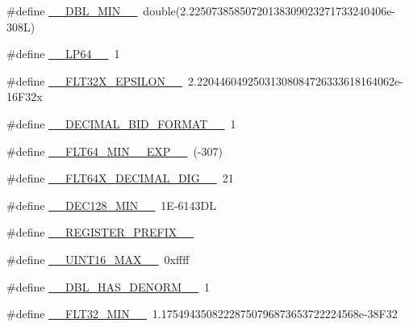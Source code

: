 \begin{DoxyCompactItemize}
\#define \hyperlink{cmake-build-debug_2babel__client__autogen_2moc__predefs_8h_a3b29a64a7b1529c08f87d256d20aade1}{\+\_\+\+\_\+\+D\+B\+L\+\_\+\+M\+I\+N\+\_\+\+\_\+}~double(2.\+22507385850720138309023271733240406e-\/308\+L)
\item 
\#define \hyperlink{cmake-build-debug_2babel__client__autogen_2moc__predefs_8h_a1939a48605c72ad163215e2279590fd5}{\+\_\+\+\_\+\+L\+P64\+\_\+\+\_\+}~1
\item 
\#define \hyperlink{cmake-build-debug_2babel__client__autogen_2moc__predefs_8h_a0d5ee390eabd4483e834007b5824373b}{\+\_\+\+\_\+\+F\+L\+T32\+X\+\_\+\+E\+P\+S\+I\+L\+O\+N\+\_\+\+\_\+}~2.\+22044604925031308084726333618164062e-\/16\+F32x
\item 
\#define \hyperlink{cmake-build-debug_2babel__client__autogen_2moc__predefs_8h_a31d221e4eef1a1f2104fe93a4236cae0}{\+\_\+\+\_\+\+D\+E\+C\+I\+M\+A\+L\+\_\+\+B\+I\+D\+\_\+\+F\+O\+R\+M\+A\+T\+\_\+\+\_\+}~1
\item 
\#define \hyperlink{cmake-build-debug_2babel__client__autogen_2moc__predefs_8h_a7a06acb3945879bcc985dde7bf0bcbdc}{\+\_\+\+\_\+\+F\+L\+T64\+\_\+\+M\+I\+N\+\_\+\_\+\+E\+X\+P\+\_\+\+\_\+}~(-\/307)
\item 
\#define \hyperlink{cmake-build-debug_2babel__client__autogen_2moc__predefs_8h_af8596ef3c857ab5d96960185ebc92014}{\+\_\+\+\_\+\+F\+L\+T64\+X\+\_\+\+D\+E\+C\+I\+M\+A\+L\+\_\+\+D\+I\+G\+\_\+\+\_\+}~21
\item 
\#define \hyperlink{cmake-build-debug_2babel__client__autogen_2moc__predefs_8h_afa4fe1921202e3770143345532136860}{\+\_\+\+\_\+\+D\+E\+C128\+\_\+\+M\+I\+N\+\_\+\+\_\+}~1\+E-\/6143\+DL
\item 
\#define \hyperlink{cmake-build-debug_2babel__client__autogen_2moc__predefs_8h_a08d4062230ffc8494f4be4f6447497e4}{\+\_\+\+\_\+\+R\+E\+G\+I\+S\+T\+E\+R\+\_\+\+P\+R\+E\+F\+I\+X\+\_\+\+\_\+}
\item 
\#define \hyperlink{cmake-build-debug_2babel__client__autogen_2moc__predefs_8h_a17f94731962876cdac979ae093f52605}{\+\_\+\+\_\+\+U\+I\+N\+T16\+\_\+\+M\+A\+X\+\_\+\+\_\+}~0xffff
\item 
\#define \hyperlink{cmake-build-debug_2babel__client__autogen_2moc__predefs_8h_ace59605d6645350a7c5cced76ffb27fa}{\+\_\+\+\_\+\+D\+B\+L\+\_\+\+H\+A\+S\+\_\+\+D\+E\+N\+O\+R\+M\+\_\+\+\_\+}~1
\item 
\#define \hyperlink{cmake-build-debug_2babel__client__autogen_2moc__predefs_8h_a5ed9c6693683a4d844cb05e49cef8337}{\+\_\+\+\_\+\+F\+L\+T32\+\_\+\+M\+I\+N\+\_\+\+\_\+}~1.\+17549435082228750796873653722224568e-\/38\+F32

\end{DoxyCompactItemize}
